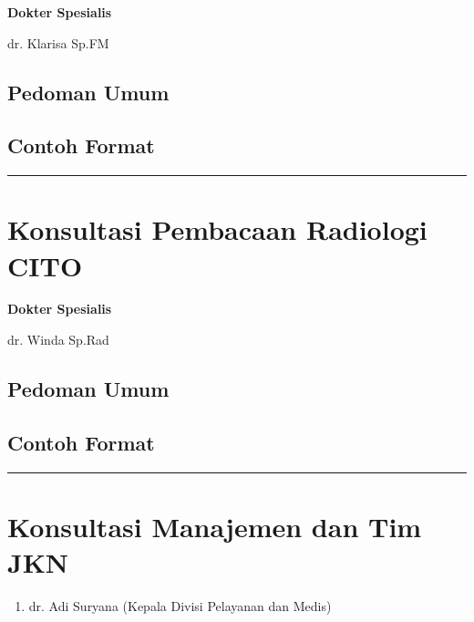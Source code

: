 \documentclass[
]{book}
\providecommand{\tightlist}{%
  \setlength{\itemsep}{0pt}\setlength{\parskip}{0pt}}
\begin{document}
\textbf{Dokter Spesialis}

dr. Klarisa Sp.FM

\hypertarget{pedoman-umum-10}{%
\subsection{Pedoman Umum}\label{pedoman-umum-10}}

\hypertarget{contoh-format-10}{%
\subsection{Contoh Format}\label{contoh-format-10}}

\begin{center}\rule{0.5\linewidth}{0.5pt}\end{center}

\hypertarget{konsultasi-pembacaan-radiologi-cito}{%
\section{Konsultasi Pembacaan Radiologi CITO}\label{konsultasi-pembacaan-radiologi-cito}}

\textbf{Dokter Spesialis}

dr. Winda Sp.Rad

\hypertarget{pedoman-umum-11}{%
\subsection{Pedoman Umum}\label{pedoman-umum-11}}

\hypertarget{contoh-format-11}{%
\subsection{Contoh Format}\label{contoh-format-11}}

\begin{center}\rule{0.5\linewidth}{0.5pt}\end{center}

\hypertarget{konsultasi-manajemen-dan-tim-jkn}{%
\section{Konsultasi Manajemen dan Tim JKN}\label{konsultasi-manajemen-dan-tim-jkn}}

\begin{enumerate}
\def\labelenumi{\arabic{enumi}.}
\tightlist
\item
  dr. Adi Suryana (Kepala Divisi Pelayanan dan Medis)
\end{enumerate}
\end{document}
